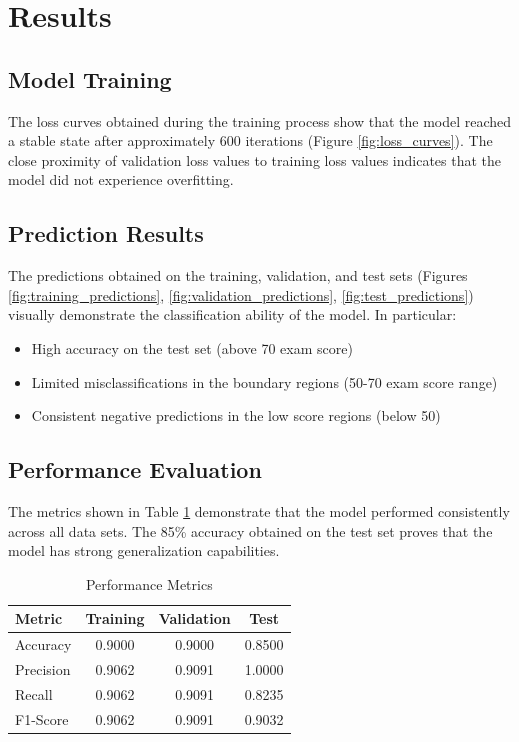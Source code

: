 \documentclass[conference]{IEEEtran}
\begin{document}
\section{Results}

\subsection{Model Training}
The loss curves obtained during the training process show that the model
reached a stable state after approximately 600 iterations (Figure
\ref{fig:loss_curves}). The close proximity of validation loss values to
training loss values indicates that the model did not experience overfitting.

\subsection{Prediction Results}
The predictions obtained on the training, validation, and test sets (Figures
\ref{fig:training_predictions}, \ref{fig:validation_predictions},
\ref{fig:test_predictions}) visually demonstrate the classification ability of
the model. In particular:

\begin{itemize}
\item High accuracy on the test set (above 70 exam score)
\item Limited misclassifications in the boundary regions (50-70 exam score range)
\item Consistent negative predictions in the low score regions (below 50)
\end{itemize}

\subsection{Performance Evaluation}
The metrics shown in Table \ref{tab:performance} demonstrate that the model
performed consistently across all data sets. The 85\% accuracy obtained on the
test set proves that the model has strong generalization capabilities.

\begin{table}[!t]
\caption{Performance Metrics}
\label{tab:performance}
\centering
\begin{tabular}{|l|c|c|c|}
\hline
\textbf{Metric} & \textbf{Training} & \textbf{Validation} & \textbf{Test} \\
\hline
Accuracy & 0.9000 & 0.9000 & 0.8500 \\
Precision & 0.9062 & 0.9091 & 1.0000 \\
Recall & 0.9062 & 0.9091 & 0.8235 \\
F1-Score & 0.9062 & 0.9091 & 0.9032 \\
\hline
\end{tabular}
\end{table}
\end{document}
